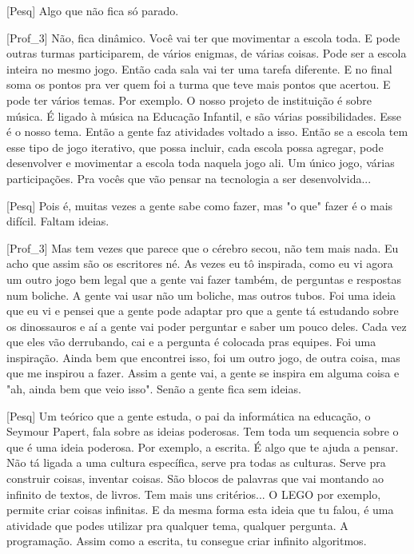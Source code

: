 [Pesq] Algo que não fica só parado.

[Prof\_3] Não, fica dinâmico. Você vai ter que movimentar a escola toda. E pode outras turmas participarem, de vários enigmas, de várias coisas. Pode ser a escola inteira no mesmo jogo. Então cada sala vai ter uma tarefa diferente. E no final soma os pontos pra ver quem foi a turma que teve mais pontos que acertou. E pode ter vários temas. Por exemplo. O nosso projeto de instituição é sobre música. É ligado à música na Educação Infantil, e são várias possibilidades. Esse é o nosso tema. Então a gente faz atividades voltado a isso. Então se a escola tem esse tipo de jogo iterativo, que possa incluir, cada escola possa agregar, pode desenvolver e movimentar a escola toda naquela jogo ali. Um único jogo, várias participações. Pra vocês que vão pensar na tecnologia a ser desenvolvida...

[Pesq] Pois é, muitas vezes a gente sabe como fazer, mas "o que" fazer é o mais difícil. Faltam ideias.

[Prof\_3] Mas tem vezes que parece que o cérebro secou, não tem mais nada. Eu acho que assim são os escritores né. As vezes eu tô inspirada, como eu vi agora um outro jogo bem legal que a gente vai fazer também, de perguntas e respostas num boliche. A gente vai usar não um boliche, mas outros tubos. Foi uma ideia que eu vi e pensei que a gente pode adaptar pro que a gente tá estudando sobre os dinossauros e aí a gente vai poder perguntar e saber um pouco deles. Cada vez que eles vão derrubando, cai e a pergunta é colocada pras equipes. Foi uma inspiração. Ainda bem que encontrei isso, foi um outro jogo, de outra coisa, mas que me inspirou a fazer. Assim a gente vai, a gente se inspira em alguma coisa e "ah, ainda bem que veio isso". Senão a gente fica sem ideias.

[Pesq] Um teórico que a gente estuda, o pai da informática na educação, o Seymour Papert, fala sobre as ideias poderosas. Tem toda um sequencia sobre o que é uma ideia poderosa. Por exemplo, a escrita. É algo que te ajuda a pensar. Não tá ligada a uma cultura específica, serve pra todas as culturas. Serve pra construir coisas, inventar coisas. São blocos de palavras que vai montando ao infinito de textos, de livros. Tem mais uns critérios... O LEGO por exemplo, permite criar coisas infinitas. E da mesma forma esta ideia que tu falou, é uma atividade que podes utilizar pra qualquer tema, qualquer pergunta. A programação. Assim como a escrita, tu consegue criar infinito algoritmos.

